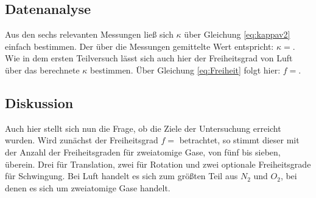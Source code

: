 	\subsection{Datenanalyse}
		
		Aus den sechs relevanten Messungen ließ sich $\kappa$ über Gleichung \ref{eq:kappav2} einfach bestimmen.
		Der über die Messungen gemittelte Wert entspricht: $\kappa = $. %
		Wie in dem ersten Teilversuch lässt sich auch hier der Freiheitsgrad von Luft über das berechnete $\kappa$ bestimmen.
		Über Gleichung \ref{eq:Freiheit} folgt hier: $f = $.
		
	\subsection{Diskussion}
		
		Auch hier stellt sich nun die Frage, ob die Ziele der Untersuchung erreicht wurden.
		Wird zunächst der Freiheitsgrad $f = $ betrachtet, so stimmt dieser mit der Anzahl der Freiheitsgraden für zweiatomige Gase, von fünf bis sieben, überein. 
		Drei für Translation, zwei für Rotation und zwei optionale Freiheitsgrade für Schwingung.
		Bei Luft handelt es sich zum größten Teil aus $N_2$ und $O_2$, bei denen es sich um zweiatomige Gase handelt.
		 